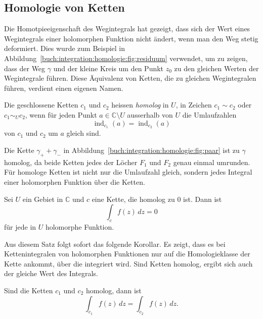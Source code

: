 %
%
%
\subsection{Homologie von Ketten
\label{buch:integration:homologie:subsection:homologie}}
Die Homotpieeigenschaft des Wegintegrals hat gezeigt, dass sich der
Wert eines Wegintegrals einer holomorphen Funktion nicht ändert, wenn
man den Weg stetig deformiert.
Dies wurde zum Beispiel in
Abbildung~\ref{buch:integration:homologie:fig:residuum}
verwendet, um zu zeigen, dass der Weg $\gamma$ und der kleine Kreis
um den Punkt $z_0$ zu den gleichen Werten der Wegintegrale führen.
Diese Äquivalenz von Ketten, die zu gleichen Wegintegralen führen,
verdient einen eigenen Namen.

\begin{definition}[homolog]
Die geschlossene Ketten $c_1$ und $c_2$ heissen \emph{homolog} in $U$,
in Zeichen $c_1\sim c_2$ oder $c_1\sim_{U}c_2$, wenn
%
für jeden Punkt $a\in \mathbb{C}\setminus U$ ausserhalb von $U$
die Umlaufzahlen
\[
\operatorname{ind}_{c_1}(a)
=
\operatorname{ind}_{c_2}(a)
\]
von $c_1$ und $c_2$ um $a$ gleich sind.
\end{definition}

Die Kette $\gamma_++\gamma_-$ in
Abbildung~\ref{buch:integration:homologie:fig:paar} ist zu $\gamma$ homolog,
da beide Ketten jedes der Löcher $F_1$ und $F_2$ genau einmal umrunden.
Für homologe Ketten ist nicht nur die Umlaufzahl gleich, sondern
jedes Integral einer holomorphen Funktion über die Ketten.

\begin{satz}
\label{buch:integration:homologie:satz:cauchyketten}
Sei $U$ ein Gebiet in $\mathbb{C}$ und
$c$ eine Kette, die homolog zu $0$ ist.
Dann ist
\[
\int_c f(z)\,dz = 0
\]
für jede in $U$ holomorphe Funktion.
\end{satz}

Aus diesem Satz folgt sofort das folgende Korollar.
Es zeigt, dass es bei Kettenintegralen von holomorphen Funktionen
nur auf die Homologieklasse der Kette ankommt, über die integriert
wird.
Sind Ketten homolog, ergibt sich auch der gleiche Wert des Integrals.

\begin{korollar}
Sind die Ketten $c_1$ und $c_2$ homolog, dann ist
\[
\int_{c_1} f(z)\,dz
=
\int_{c_2} f(z)\,dz.
\]
\end{korollar}

